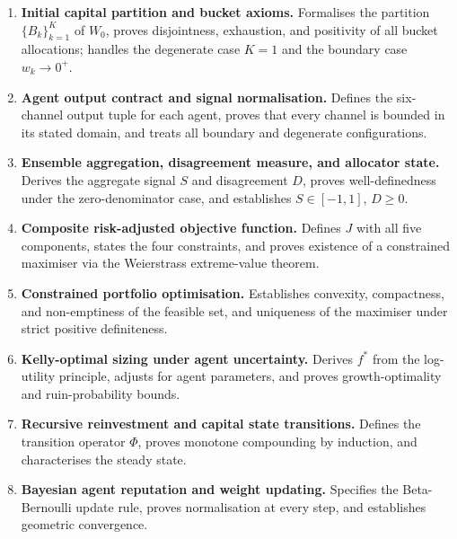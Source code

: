 \documentclass[12pt,openany]{book}
\numberwithin{equation}{chapter}
\theoremstyle{plain}
\theoremstyle{definition}
\theoremstyle{remark}
\numberwithin{equation}{chapter}
\theoremstyle{plain}
\begin{document}
\begin{enumerate}[label=\textbf{Ch.~\arabic*.}, leftmargin=3.5em,
                  itemsep=3pt, parsep=0pt, topsep=4pt]
  \item \textbf{Initial capital partition and bucket axioms.}\enspace
        Formalises the partition $\{B_k\}_{k=1}^K$ of $W_0$,
        proves disjointness, exhaustion, and positivity of all
        bucket allocations; handles the degenerate case $K=1$
        and the boundary case $w_k \to 0^+$.

  \item \textbf{Agent output contract and signal normalisation.}\enspace
        Defines the six-channel output tuple for each agent,
        proves that every channel is bounded in its stated domain,
        and treats all boundary and degenerate configurations.

  \item \textbf{Ensemble aggregation, disagreement measure, and
        allocator state.}\enspace
        Derives the aggregate signal $S$ and disagreement $D$,
        proves well-definedness under the zero-denominator case,
        and establishes $S\in[-1,1]$, $D\ge 0$.

  \item \textbf{Composite risk-adjusted objective function.}\enspace
        Defines $J$ with all five components, states the four
        constraints, and proves existence of a constrained
        maximiser via the Weierstrass extreme-value theorem.

  \item \textbf{Constrained portfolio optimisation.}\enspace
        Establishes convexity, compactness, and non-emptiness of
        the feasible set, and uniqueness of the maximiser under
        strict positive definiteness.

  \item \textbf{Kelly-optimal sizing under agent uncertainty.}\enspace
        Derives $f^*$ from the log-utility principle, adjusts for
        agent parameters, and proves growth-optimality and
        ruin-probability bounds.

  \item \textbf{Recursive reinvestment and capital state transitions.}\enspace
        Defines the transition operator $\Phi$, proves monotone
        compounding by induction, and characterises the steady
        state.

  \item \textbf{Bayesian agent reputation and weight updating.}\enspace
        Specifies the Beta-Bernoulli update rule, proves
        normalisation at every step, and establishes geometric
        convergence.


\end{enumerate}
\end{document}
